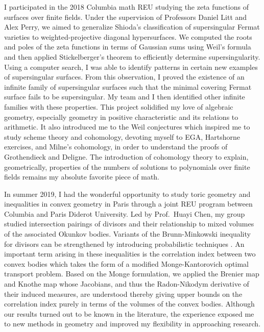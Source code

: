 \documentclass[11pt]{article}
\begin{document}
I participated in the 2018 Columbia math REU studying the zeta functions of surfaces over finite fields. Under the supervision of Professors Daniel Litt and Alex Perry, we aimed to generalize Shioda’s classification of supersingular Fermat varieties  to weighted-projective diagonal hypersurfaces. We computed the roots and poles of the zeta functions in terms of Gaussian sums using Weil's formula and then applied Stickelberger's theorem to efficiently determine supersingularity. Using a computer search, I was able to identify patterns in certain new examples of supersingular surfaces. From this observation, I proved the existence of an infinite family of supersingular surfaces such that the minimal covering Fermat surface fails to be supersingular. My team and I then identified other infinite families with these properties. This project solidified my love of algebraic geometry, especially geometry in positive characteristic and its relations to arithmetic. It also introduced me to the Weil conjectures which inspired me to study scheme theory and \etale cohomology, devoting myself to EGA, Hartshorne exercises, and Milne's \etale cohomology, in order to understand the proofs of Grothendieck and Deligne. The introduction of \etale cohomology theory to explain, geometrically, properties of the numbers of solutions to polynomials over finite fields remains my absolute favorite piece of math. 
\par
In summer 2019, I had the wonderful opportunity to study toric geometry and inequalities in convex geometry in Paris through a joint REU program between Columbia and Paris Diderot University. Led by Prof.\ Huayi Chen, my group studied intersection pairings of divisors and their relationship to mixed volumes of the associated Okunkov bodies. Variants of the Brunn-Minkowski inequality for divisors can be strengthened by introducing probabilistic techniques .
An important term arising in these inequalities is the correlation index between two convex bodies which takes the form of a modified Monge-Kantorovich optimal transport problem. Based on the Monge formulation, we applied the Brenier map and Knothe map whose Jacobians, and thus the Radon-Nikodym derivative of their induced measures, are understood thereby giving upper bounds on the correlation index purely in terms of the volumes of the convex bodies. Although our results turned out to be known in the literature, the experience exposed me to new methods in geometry and improved my flexibility in approaching research.
\end{document}
